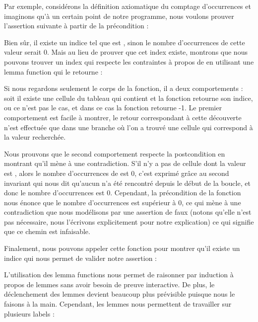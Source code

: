 Par exemple, considérons la définition axiomatique du comptage d'occurrences et
imaginons qu'à un certain point de notre programme, nous voulons prouver 
l'assertion suivante à partir de la précondition :




Bien sûr, il existe un indice  tel que  est
, sinon le nombre d'occurrences de cette valeur serait $0$.
Mais au lieu de prouver que cet index existe, montrons que nous pouvons trouver
un index qui respecte les contraintes à propos de  en utilisant
une lemma function qui le retourne :




Si nous regardons seulement le corps de la fonction, il a deux comportements :
soit il existe une cellule du tableau qui contient  et la fonction
retourne son indice, ou ce n'est pas le cas, et dans ce cas la fonction retourne
-1. Le premier comportement est facile à montrer, le retour correspondant à cette
découverte n'est effectuée que dans une branche où l'on a trouvé une cellule qui
correspond à la valeur recherchée.


Nous prouvons que le second comportement respecte la postcondition en montrant
qu'il mène à une contradiction. S'il n'y a pas de cellule dont la valeur est 
, alors le nombre d'occurrences de  est 0, c'est
exprimé grâce au second invariant qui nous dit qu'aucun  n'a été
rencontré depuis le début de la boucle, et donc le nombre d'occurrences est 0.
Cependant, la précondition de la fonction nous énonce que le nombre d'occurrences
est supérieur à 0, ce qui mène à une contradiction que nous modélisons par une
assertion de faux (notons qu'elle n'est pas nécessaire, nous l'écrivons 
explicitement pour notre explication) ce qui signifie que ce chemin est
infaisable.


Finalement, nous pouvons appeler cette fonction pour montrer qu'il existe un
indice qui nous permet de valider notre assertion :




L'utilisation des lemma functions nous permet de raisonner par induction à 
propos de lemmes sans avoir besoin de preuve interactive. De plus, le
déclenchement des lemmes devient beaucoup plus prévisible puisque nous le
faisons à la main. Cependant, les lemmes nous permettent de travailler sur
plusieurs labels :



